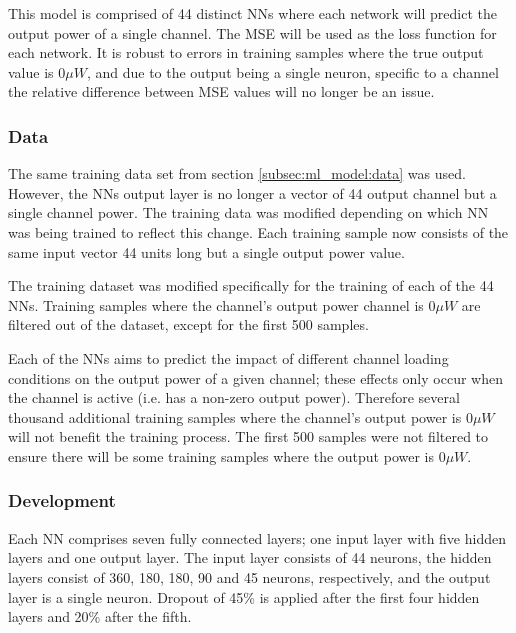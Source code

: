 This model is comprised of 44 distinct NNs where each network will predict the output power of a single channel. The MSE will be used as the loss function for each network. It is robust to errors in training samples where the true output value is $0\mu W$, and due to the output being a single neuron, specific to a channel the relative difference between MSE values will no longer be an issue.


\subsubsection{Data}
The same training data set from section \ref{subsec:ml_model:data} was used. However, the NNs output layer is no longer a vector of 44 output channel but a single channel power. The training data was modified depending on which NN was being trained to reflect this change. Each training sample now consists of the same input vector 44 units long but a single output power value. 

The training dataset was modified specifically for the training of each of the 44 NNs. Training samples where the channel’s output power channel is $0\mu W$ are filtered out of the dataset, except for the first 500 samples. 

Each of the NNs aims to predict the impact of different channel loading conditions on the output power of a given channel; these effects only occur when the channel is active (i.e. has a non-zero output power). Therefore several thousand additional training samples where the channel’s output power is $0\mu W$ will not benefit the training process. The first 500 samples were not filtered to ensure there will be some training samples where the output power is $0\mu W$.



\subsubsection{Development}


Each NN comprises seven fully connected layers; one input layer with five hidden layers and one output layer. The input layer consists of 44 neurons, the hidden layers consist of 360, 180, 180, 90 and 45 neurons, respectively, and the output layer is a single neuron. Dropout of 45\% is applied after the first four hidden layers and 20\% after the fifth. 


